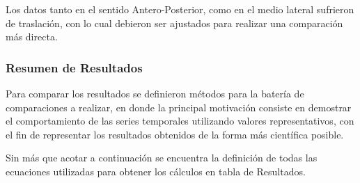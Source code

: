 \documentclass[12pt,a4paper]{article}
\begin{document}
Los datos tanto en el sentido Antero-Posterior, como en el medio lateral sufrieron de traslación, con lo cual debieron ser ajustados para realizar una comparación más directa.

\newpage
\subsubsection{Resumen de Resultados}

Para comparar los resultados se definieron métodos para la batería de comparaciones a realizar, en donde la principal motivación consiste en demostrar el comportamiento de las series temporales utilizando valores representativos, con el fin de representar los resultados obtenidos de la forma más científica posible. 

Sin más que acotar a continuación se encuentra la definición de todas las ecuaciones utilizadas para obtener los cálculos  en tabla de Resultados.
\newline
\end{document}
